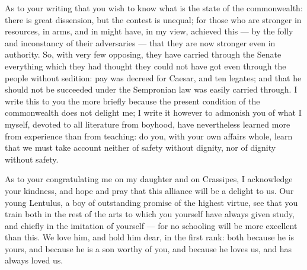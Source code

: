  As to your writing that you wish to know what is the state of the commonwealth: there is great dissension, but the contest is unequal; for those who are stronger in resources, in arms, and in might have, in my view, achieved this --- by the folly and inconstancy of their adversaries --- that they are now stronger even in authority. So, with very few opposing, they have carried through the Senate everything which they had thought they could not have got even through the people without sedition: pay was decreed for Caesar, and ten legates; and that he should not be succeeded under the Sempronian law was easily carried through. I write this to you the more briefly because the present condition of the commonwealth does not delight me; I write it however to admonish you of what I myself, devoted to all literature from boyhood, have nevertheless learned more from experience than from teaching: do you, with your own affairs whole, learn that we must take account neither of safety without dignity, nor of dignity without safety.

 As to your congratulating me on my daughter and on Crassipes, I acknowledge your kindness, and hope and pray that this alliance will be a delight to us. Our young Lentulus, a boy of outstanding promise of the highest virtue, see that you train both in the rest of the arts to which you yourself have always given study, and chiefly in the imitation of yourself --- for no schooling will be more excellent than this. We love him, and hold him dear, in the first rank: both because he is yours, and because he is a son worthy of you, and because he loves us, and has always loved us.
